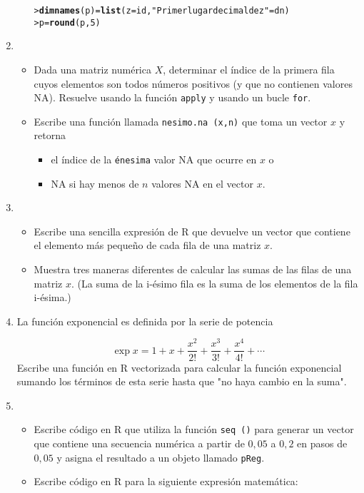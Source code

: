 \documentclass{article}\usepackage[]{graphicx}\usepackage[]{color}
\makeatletter
\newcommand{\hlnum}[1]{\textcolor[rgb]{0.686,0.059,0.569}{#1}}%
\newcommand{\hlstr}[1]{\textcolor[rgb]{0.192,0.494,0.8}{#1}}%
\newcommand{\hlstd}[1]{\textcolor[rgb]{0.345,0.345,0.345}{#1}}%
\newcommand{\hlkwb}[1]{\textcolor[rgb]{0.69,0.353,0.396}{#1}}%
\newcommand{\hlkwc}[1]{\textcolor[rgb]{0.333,0.667,0.333}{#1}}%
\newcommand{\hlkwd}[1]{\textcolor[rgb]{0.737,0.353,0.396}{\textbf{#1}}}%
\newenvironment{kframe}{%
 \def\at@end@of@kframe{}%
 \ifinner\ifhmode%
  \def\at@end@of@kframe{\end{minipage}}%
  \begin{minipage}{\columnwidth}%
 \fi\fi%
 \def\FrameCommand##1{\hskip\@totalleftmargin \hskip-\fboxsep
 \colorbox{shadecolor}{##1}\hskip-\fboxsep
     \hskip-\linewidth \hskip-\@totalleftmargin \hskip\columnwidth}%
 \MakeFramed {\advance\hsize-\width
   \@totalleftmargin\z@ \linewidth\hsize
   \@setminipage}}%
 {\par\unskip\endMakeFramed%
 \at@end@of@kframe}
\newenvironment{knitrout}{}{} %
\makeatother
\begin{document}
\begin{enumerate}
\begin{itemize}
\begin{knitrout}
\begin{kframe}
\begin{alltt}
\hlstd{> }\hlkwd{dimnames}\hlstd{(p)} \hlkwb{=} \hlkwd{list}\hlstd{(}\hlkwc{z} \hlstd{= id,} \hlstr{"Primer lugar decimal de z "} \hlstd{= dn)}
\hlstd{> }\hlstd{p} \hlkwb{=} \hlkwd{round}\hlstd{(p,} \hlnum{5}\hlstd{)}
\end{alltt}
\end{kframe}
\end{knitrout}
\end{itemize}
\item
\begin{itemize}
\item Dada una matriz num\'erica $X$, determinar el \'indice de la primera fila cuyos elementos son todos  n\'umeros positivos (y que no contienen  valores  NA). Resuelve usando la funci\'on \texttt{apply} y usando un bucle \texttt{for}.
\item Escribe una funci\'on llamada \texttt{nesimo.na (x,n)} que toma un vector $x$ y retorna 
\begin{itemize}
\item el \'indice de la \texttt{\'enesima} valor NA que ocurre en $x$ o
\item NA si hay menos de $n$ valores NA en el vector $x$. 
\end{itemize}
\end{itemize}
\item 
\begin{itemize}
\item Escribe una sencilla expresi\'on de R que devuelve un vector que contiene el elemento m\'as \mbox{peque\~no} de cada fila de una matriz $x$.
\item Muestra tres maneras diferentes de calcular las sumas de las filas de una matriz $x$. (La suma de la i-\'esimo fila es la suma de los elementos de la fila i-\'esima.)
\end{itemize}
\item La funci\'on exponencial es definida por la serie de potencia

\[
\exp x = 1 + x + \frac{x^2}{2!} + \frac{x^3}{3!} + \frac{x^4}{4!} + \cdots
\]
Escribe una funci\'on en R vectorizada para calcular la funci\'on exponencial sumando los t\'erminos de esta serie hasta que "no haya cambio en la suma".
\item 

\begin{itemize}
\item Escribe c\'odigo en R que utiliza la funci\'on \texttt{seq ()} para generar un vector que contiene una secuencia num\'erica a partir de $0,05$ a $0,2$ en pasos de $0,05$ y asigna el resultado a un objeto llamado \texttt{pReg}.
\item Escribe c\'odigo en R para la siguiente expresi\'on matem\'atica:


\end{itemize}
\end{enumerate}
\end{document}
